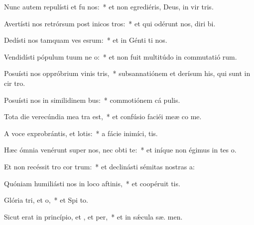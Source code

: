 \item Nunc autem repulísti et fu nos:~* et non egrediéris, Deus, in vir tris.
\item Avertísti nos retrórsum post inicos tros:~* et qui odérunt nos, diri bi.
\item Dedísti nos tamquam ves esrum:~* et in Génti ti nos.
\item Vendidísti pópulum tuum ne o:~* et non fuit multitúdo in commutatió rum.
\item Posuísti nos oppróbrium vinis tris,~* subsannatiónem et derísum his, qui sunt in cir tro.
\item Posuísti nos in similidinem bus:~* commotiónem cá  pulis.
\item Tota die verecúndia mea tra  est,~* et confúsio faciéi meæ co me.
\item A voce exprobrántis, et lotis:~* a fácie inimíci,  tis.
\item Hæc ómnia venérunt super nos, nec obti  te:~* et iníque non égimus in tes o.
\item Et non recéssit tro cor trum:~* et declinásti sémitas nostras   a:
\item Quóniam humiliásti nos in loco aftinis,~* et coopéruit   tis.
\item Glória tri, et o,~* et Spi to.
\item Sicut erat in princípio, et , et per,~* et in sǽcula sæ. men.
